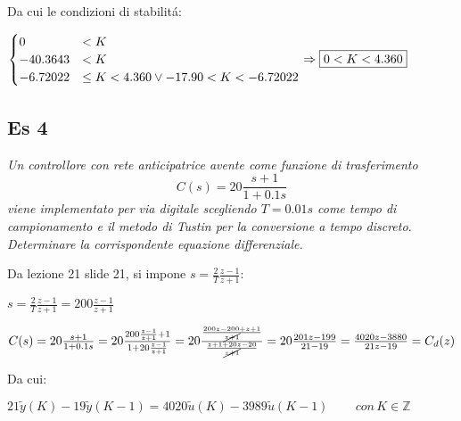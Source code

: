 \documentclass{article}
\begin{document}
\bigbreak
Da cui le condizioni di stabilit\'a:

$ \begin{cases}
    0 &< K\\
    -40.3643 &< K\\
    -6.72022 &\le K < 4.360 \lor -17.90 < K < -6.72022
\end{cases} \Rightarrow \framebox{$0<K < 4.360$}
$


\subsection{Es 4}

\textit{Un controllore con rete anticipatrice avente come funzione di trasferimento
    \[ C(s) = 20 \frac{s+1}{1+0.1s} \]
    viene implementato per via digitale scegliendo $T = 0.01s$ come tempo di campionamento e il metodo di Tustin per la conversione a tempo discreto.\\
    Determinare la corrispondente equazione differenziale.
}

\bigbreak
Da lezione 21 slide 21, si impone $s = \frac{2}{T} \frac{z-1}{z+1} $:

$ s =  \frac{2}{T} \frac{z-1}{z+1} = 200 \frac{z-1}{z+1}$

\bigbreak
$ C(s) = 20 \frac{s+1}{1+0.1s}  = 20 \frac{200\frac{z-1}{z+1} + 1}{1 + 20\frac{z-1}{z+1}} = 20 \frac{\frac{200z - 200 + z + 1}{\cancel{z+1}}}{\frac{z+1+20z - 20}{\cancel{z+1}}} = 20\frac{201z - 199}{21 -19} = \frac{4020z- 3880}{21z - 19} = C_d(z)$

\bigbreak
Da cui:

$ 21\tilde{y}(K) - 19\tilde{y}(K-1) = 4020\tilde{u}(K) - 3989\tilde{u}(K-1)\qquad\,con\, K \in \mathbb{Z} $
\end{document}
